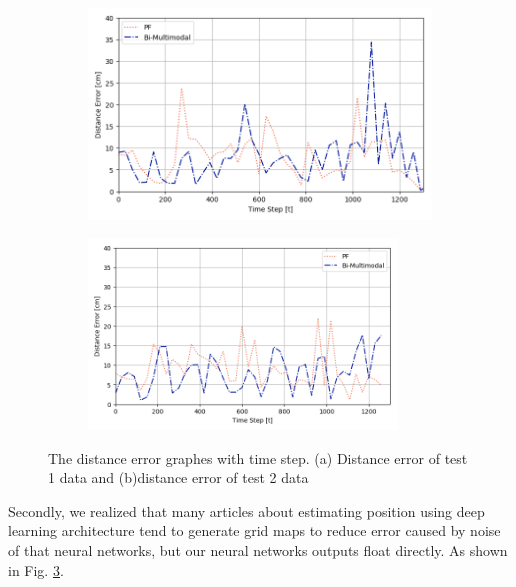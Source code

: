 \documentclass[letterpaper, 10 pt, conference]{ieeeconf}  %
\begin{document}
 \begin{figure}[h]
 	\centering
 	\begin{subfigure}[b]{.50\textwidth}
 		\centering
 		\includegraphics[width=.9\textwidth]{PF_multimodal_error1}
 		\label{fig:error1} 	
 		\caption{}
 	\end{subfigure}%
 	\begin{subfigure}[b]{.50\textwidth}
 		\centering
 		\includegraphics[width=0.9\textwidth]{PF_multimodal_error2}
 		\label{fig:error2} 	
 		\caption{}
 	\end{subfigure}
 	\caption{The distance error graphes with time step. (a) Distance error of test 1 data  and (b)distance error of test 2 data}
 	\label{fig:error}
 \end{figure} 
  
 Secondly, we realized that many articles about estimating position using deep learning architecture tend to generate grid maps to reduce error caused by noise of that neural networks, but our neural networks outputs float directly. As shown in Fig. \ref{fig:error}. 
 
\end{document}
